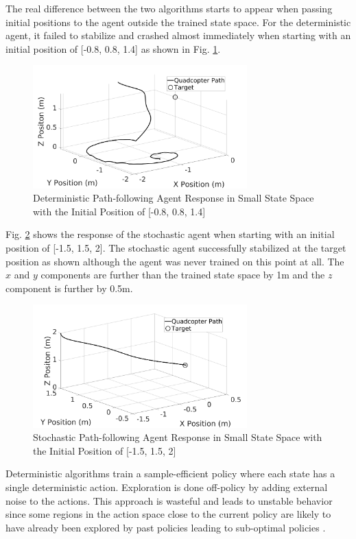         The real difference between the two algorithms starts to appear when passing initial positions to the agent outside the trained state space. For the deterministic agent, it failed to stabilize and crashed almost immediately when starting with an initial position of [-0.8, 0.8, 1.4] as shown in Fig. \ref{offT0.5}. 
    \begin{figure}[H]
            \centering
            \includegraphics[width=0.735\textwidth]{plots/off_td3_0_5.jpg}
            \caption{Deterministic Path-following Agent Response in Small State Space with the Initial Position of [-0.8, 0.8, 1.4]}
            \label{offT0.5}
    \end{figure}
    Fig. \ref{offS0.5} shows the response of the stochastic agent when starting with an initial position of [-1.5, 1.5, 2]. The stochastic agent successfully stabilized at the target position as shown although the agent was never trained on this point at all. The $x$ and $y$ components are further than the trained state space by 1m and the $z$ component is further by 0.5m.  
    \begin{figure}[H]
            \centering
            \includegraphics[width=0.735\textwidth]{plots/off_SAC_0_5.jpg}
            \caption{Stochastic Path-following Agent Response in Small State Space with the Initial Position of [-1.5, 1.5, 2]}
            \label{offS0.5}
    \end{figure}
Deterministic algorithms train a sample-efficient policy where each state has a single deterministic action. Exploration is done off-policy by adding external noise to the actions. This approach is wasteful and leads to unstable behavior since some regions in the action space close to the current policy are likely to have already been explored by past policies leading to sub-optimal policies \cite{NEURIPS2019_a34bacf8}.
    
